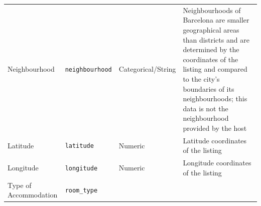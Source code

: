 \documentclass[]{article}
\begin{document}
\begin{longtable}[]{@{}llll@{}}
\begin{minipage}[t]{0.22\columnwidth}\raggedright
Neighbourhood\strut
\end{minipage} & \begin{minipage}[t]{0.22\columnwidth}\raggedright
\texttt{neighbourhood}\strut
\end{minipage} & \begin{minipage}[t]{0.22\columnwidth}\raggedright
Categorical/String\strut
\end{minipage} & \begin{minipage}[t]{0.22\columnwidth}\raggedright
Neighbourhoods of Barcelona are smaller geographical areas than
districts and are determined by the coordinates of the listing and
compared to the city's boundaries of its neighbourhoods; this data is
not the neighbourhood provided by the host\strut
\end{minipage}\tabularnewline
\begin{minipage}[t]{0.22\columnwidth}\raggedright
Latitude\strut
\end{minipage} & \begin{minipage}[t]{0.22\columnwidth}\raggedright
\texttt{latitude}\strut
\end{minipage} & \begin{minipage}[t]{0.22\columnwidth}\raggedright
Numeric\strut
\end{minipage} & \begin{minipage}[t]{0.22\columnwidth}\raggedright
Latitude coordinates of the listing\strut
\end{minipage}\tabularnewline
\begin{minipage}[t]{0.22\columnwidth}\raggedright
Longitude\strut
\end{minipage} & \begin{minipage}[t]{0.22\columnwidth}\raggedright
\texttt{longitude}\strut
\end{minipage} & \begin{minipage}[t]{0.22\columnwidth}\raggedright
Numeric\strut
\end{minipage} & \begin{minipage}[t]{0.22\columnwidth}\raggedright
Longitude coordinates of the listing\strut
\end{minipage}\tabularnewline
\begin{minipage}[t]{0.22\columnwidth}\raggedright
Type of Accommodation\strut
\end{minipage} & \begin{minipage}[t]{0.22\columnwidth}\raggedright
\texttt{room\_type}\strut

\end{minipage}
\end{longtable}
\end{document}
